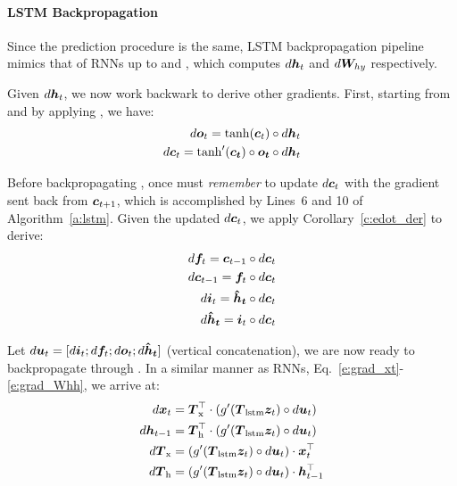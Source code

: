 \paragraph{LSTM Backpropagation}
Since the prediction procedure is the same, LSTM backpropagation pipeline mimics
that of RNNs up to  and , which computes $d\bm{h}_{t}$
and $d\bm{W}_{hy}$ respectively.

Given $d\bm{h}_{t}$, we now work backwark to derive other gradients. First,
starting from  and by applying
, we have:
\begin{align}                        
d\bm{o}_{t} = \tanh(\bm{c}_{t}) \circ d\bm{h}_{t} \\
d\bm{c}_{t} = \tanh'(\bm{\bm{c}_{t}}) \circ \bm{\bm{o}_{t}} \circ d\bm{h}_{t} 
\end{align} 

Before backpropagating , once must {\it remember} to update $d\bm{c}_{t}$ with the gradient sent back from $\bm{c}_{t+1}$, which is accomplished by Lines~6 and 10 of Algorithm~\ref{a:lstm}. Given the updated $d\bm{c}_{t}$, we apply Corollary~\ref{c:edot_der} to derive: 
\begin{align}                        
d\bm{f}_{t} = \bm{c}_{t-1} \circ d\bm{c}_{t} \\
d\bm{c}_{t-1} = \bm{f}_{t} \circ d\bm{c}_{t} \\
d\bm{i}_{t} = \mbox{\boldmath{$\hat{h}_t$}} \circ d\bm{c}_{t} \\
d\mbox{\boldmath{$\hat{h}_t$}} = \bm{i}_{t} \circ d\bm{c}_{t}
\end{align} 


Let $d\bm{u}_t = [d\bm{i}_{t}; d\bm{f}_{t}; d\bm{o}_{t}; d\mbox{\boldmath{$\hat{h}_t$}}]$ (vertical concatenation), we are now ready to backpropagate through . In a similar manner as RNNs, Eq.~\ref{e:grad_xt}-\ref{e:grad_Whh}, we arrive at:
\begin{align}
d\bm{x}_{t} &=  \mbox{\boldmath{$T$}}_{\text{x}}^\top \cdot \left(g'(\mbox{\boldmath{$T$}}_{\text{lstm}} \bm{z}_{t}) \circ d\bm{u}_t\right)\\
d\bm{h}_{t-1} &=  \mbox{\boldmath{$T$}}_{\text{h}}^\top \cdot \left(g'(\mbox{\boldmath{$T$}}_{\text{lstm}} \bm{z}_{t}) \circ d\bm{u}_t\right)\\
d\mbox{\boldmath{$T$}}_{\text{x}} &=  \left(g'(\mbox{\boldmath{$T$}}_{\text{lstm}} \bm{z}_{t}) \circ d\bm{u}_t\right) \cdot \bm{x}_{t}^\top \\
d\mbox{\boldmath{$T$}}_{\text{h}} &=  \left(g'(\mbox{\boldmath{$T$}}_{\text{lstm}} \bm{z}_{t}) \circ d\bm{u}_t\right) \cdot \bm{h}_{t-1}^\top
\end{align}

